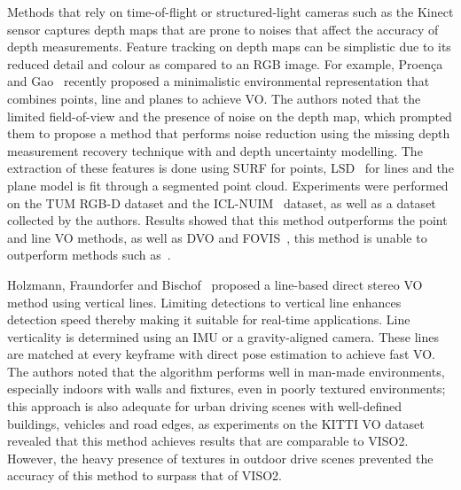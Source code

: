 
Methods that rely on time-of-flight or structured-light cameras such as the Kinect sensor captures depth maps that are prone to noises that affect the accuracy of depth measurements. Feature tracking on depth maps can be simplistic due to its reduced detail and colour as compared to an RGB image. For example, Proen\c{c}a and Gao~\cite{proenca_probabilistic_2018} recently proposed a minimalistic environmental representation that combines points, line and planes to achieve VO. The authors noted that the limited field-of-view and the presence of noise on the depth map, which prompted them to propose a method that performs noise reduction using the missing depth measurement recovery technique with and depth uncertainty modelling. The extraction of these features is done using SURF for points, LSD~\cite{gioi_lsd:_2010} for lines and the plane model is fit through a segmented point cloud. Experiments were performed on the TUM RGB-D dataset and the ICL-NUIM~\cite{handa_benchmark_2014} dataset, as well as a dataset collected by the authors. Results showed that this method outperforms the point and line VO methods, as well as DVO and FOVIS~\cite{huang_visual_2017}, this method is unable to outperform methods such as~\cite{newcombe_kinectfusion:_2011,gutierrez-gomez_dense_2016}.

Holzmann, Fraundorfer and Bischof~\cite{holzmann_detailed_2016} proposed a line-based direct stereo VO method using vertical lines. Limiting detections to vertical line enhances detection speed thereby making it suitable for real-time applications. Line verticality is determined using an IMU or a gravity-aligned camera. These lines are matched at every keyframe with direct pose estimation to achieve fast VO. The authors noted that the algorithm performs well in man-made environments, especially indoors with walls and fixtures, even in poorly textured environments; this approach is also adequate for urban driving scenes with  well-defined buildings, vehicles and road edges, as experiments on the KITTI VO dataset revealed that this method achieves results that are comparable to VISO2. However, the heavy presence of textures in outdoor drive scenes prevented the accuracy of this method to surpass that of VISO2. 

